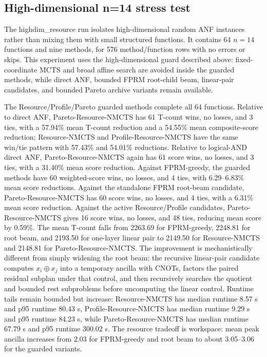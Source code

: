 \documentclass[11pt]{article}
\newcommand{\method}{Resource-NMCTS}
\newcommand{\profilemethod}{Profile-Resource-NMCTS}
\newcommand{\paretomethod}{Pareto-Resource-NMCTS}
\newcommand{\highdimdataset}{highdim\_resource}
\begin{document}
\subsection{High-dimensional n=14 stress test}

The \highdimdataset{} run isolates high-dimensional random ANF instances rather
than mixing them with small structured functions.  It contains 64 $n=14$
functions and nine methods, for 576 method/function rows with no errors or
skips.  This experiment uses the high-dimensional guard described above:
fixed-coordinate MCTS and broad affine search are avoided inside the guarded
methods, while direct ANF, bounded FPRM root-child beam, linear-pair candidates,
and bounded Pareto archive variants remain available.

\begin{table}[t]
\centering
\small
\caption{Mean logical resources on the \highdimdataset{} $n=14$ stress
benchmark.}
\label{tab:highdim-resources}

\end{table}

\begin{table}[t]
\centering
\small
\caption{Runtime distribution on the \highdimdataset{} $n=14$ stress
benchmark.}
\label{tab:highdim-runtime}

\end{table}

The Resource/Profile/Pareto guarded methods complete all 64 functions.
Relative to direct ANF, \paretomethod{} has 61 T-count wins, no losses, and 3
ties, with a 57.94\% mean T-count reduction and a 54.55\% mean composite-score
reduction; \method{} and \profilemethod{} have the same win/tie pattern with
57.43\% and 54.01\% reductions.  Relative to logical-AND direct ANF,
\paretomethod{} again has 61 score wins, no losses, and 3 ties, with a 31.40\%
mean score reduction.  Against FPRM-greedy, the guarded methods have 60
weighted-score wins, no losses, and 4 ties, with 6.29--6.83\% mean score
reductions.  Against the standalone FPRM root-beam candidate, \paretomethod{}
has 60 score wins, no losses, and 4 ties, with a 6.31\% mean score reduction.
Against the active Resource/Profile candidates, \paretomethod{} gives 16 score
wins, no losses, and 48 ties, reducing mean score by 0.59\%.  The mean T-count
falls from 2263.69 for FPRM-greedy, 2248.81 for root beam, and 2193.50 for
one-layer linear pair to 2149.50 for \method{} and 2148.81 for
\paretomethod{}.  The improvement is mechanistically different from simply
widening the root beam: the recursive linear-pair candidate computes
$x_i \oplus x_j$ into a temporary ancilla with CNOTs, factors the paired
residual subplan under that control, and then recursively searches the quotient
and bounded rest subproblems before uncomputing the linear control.  Runtime
tails remain bounded but increase: \method{} has median runtime 8.57 s and
p95 runtime 80.43 s, \profilemethod{} has median runtime 9.29 s and p95
runtime 84.23 s, while \paretomethod{} has median
runtime 67.79 s and p95 runtime 300.02 s.  The resource tradeoff is workspace:
mean peak ancilla increases from 2.03 for FPRM-greedy and root beam to about
3.05--3.06 for the guarded variants.
\end{document}
